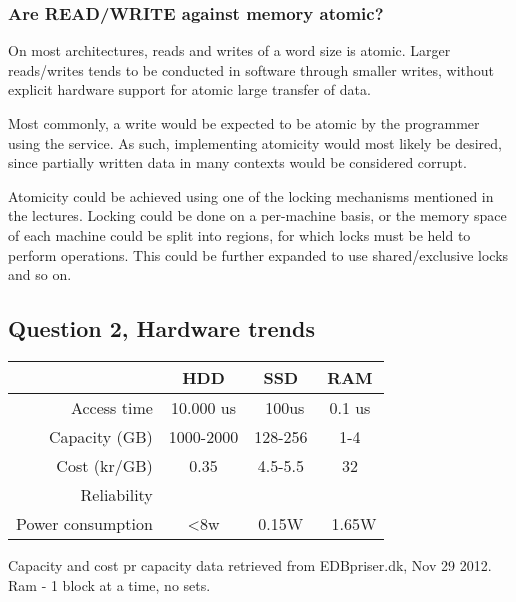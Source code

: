 \documentclass[11pt,a4paper]{article}
\begin{document}
\subsubsection{Are READ/WRITE against memory atomic?}
On most architectures, reads and writes of a word size is atomic. Larger 
reads/writes tends to be conducted in software through smaller writes,
without explicit hardware support for atomic large transfer of data.

Most commonly, a write would be expected to be atomic by the programmer using
the service. As such, implementing atomicity would most likely be desired, since
partially written data in many contexts would be considered corrupt.

Atomicity could be achieved using one of the locking mechanisms mentioned
in the lectures. Locking could be done on a per-machine basis, or the
memory space of each machine could be split into regions, for which locks
must be held to perform operations. This could be further expanded to use
shared/exclusive locks and so on.

\subsection{Question 2, Hardware trends}

\begin{tabular}{|r|c|c|c|}
    \hline
                    & HDD & SSD & RAM\\\hline
    Access time     & 10.000 us & ~100us & 0.1 us\\\hline %
    Capacity (GB)   & 1000-2000 & 128-256 & 1-4 \\\hline
    Cost (kr/GB)    & 0.35 & 4.5-5.5 & 32 \\\hline
    Reliability     & & & \\\hline %
    Power consumption & <8w & 0.15W & ~1.65W \\\hline 

\end{tabular}
Capacity and cost pr capacity data retrieved from EDBpriser.dk, Nov 29 2012.
Ram - 1 block at a time, no sets.
\end{document}
